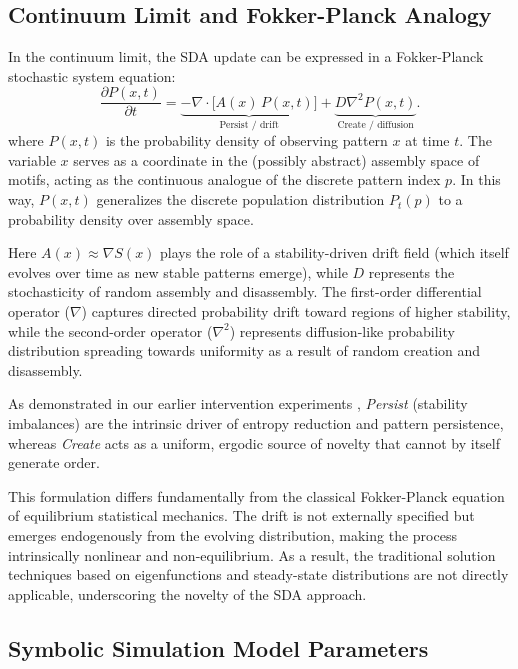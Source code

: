 \documentclass[life,article,submit,pdftex,moreauthors]{Definitions/mdpi}
\begin{document}
\subsection{Continuum Limit and Fokker-Planck Analogy}

In the continuum limit, the SDA update can be expressed in a Fokker-Planck \cite{gardiner2009} stochastic system equation:
\begin{equation}
\frac{\partial P(x,t)}{\partial t}
= \underbrace{- \nabla \cdot \big[ A(x)\, P(x,t) \big]}_{\text{Persist / drift}}
+ \underbrace{D \nabla^2 P(x,t)}_{\text{Create / diffusion}}.
\end{equation}
where $P(x,t)$ is the probability density of observing pattern $x$ at time $t$. 
The variable $x$ serves as a coordinate in the (possibly abstract) assembly space 
of motifs, acting as the continuous analogue of the discrete pattern index $p$. 
In this way, $P(x,t)$ generalizes the discrete population distribution $P_t(p)$ 
to a probability density over assembly space.


Here $A(x) \approx \nabla S(x)$ plays the role of a stability-driven drift 
field (which itself evolves over time as new stable patterns emerge), while 
$D$ represents the stochasticity of random assembly and disassembly. The first-order differential operator ($\nabla$) captures directed probability drift toward 
regions of higher stability, while the second-order operator ($\nabla^2$) 
represents diffusion-like probability distribution spreading towards uniformity
as a result of random creation and disassembly.

As demonstrated in our earlier intervention experiments \cite{adler_sda}, 
\textit{Persist} (stability imbalances) are the intrinsic driver of entropy 
reduction and pattern persistence, whereas \textit{Create} acts as a 
uniform, ergodic source of novelty that cannot by itself generate order.  

This formulation differs fundamentally from the classical Fokker-Planck 
equation of equilibrium statistical mechanics. The drift is not externally 
specified but emerges endogenously from the evolving distribution, making the 
process intrinsically nonlinear and non-equilibrium. As a result, the 
traditional solution techniques based on eigenfunctions and steady-state 
distributions are not directly applicable, underscoring the novelty of the SDA 
approach.

\subsection{Symbolic Simulation Model Parameters}
\end{document}
